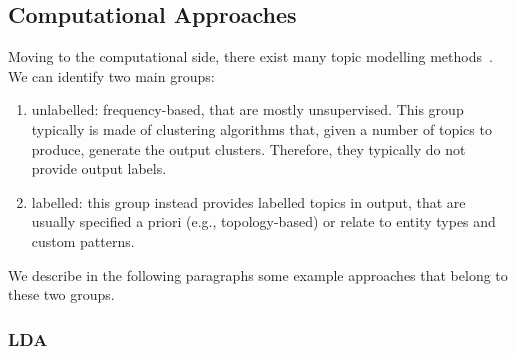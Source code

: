 



\subsection{\statusgreen Computational Approaches}
\label{sec:lit_topics_computation}

Moving to the computational side, there exist many topic modelling methods~\citep{vayansky2020review,ramage2009topic,churchill2022evolution,kherwa2019topic}.
We can identify two main groups:
\begin{enumerate}
    \item unlabelled: frequency-based, that are mostly unsupervised. This group typically is made of clustering algorithms that, given a number of topics to produce, generate the output clusters. Therefore, they typically do not provide output labels. %
    \item labelled: this group instead provides labelled topics in output, that are usually specified a priori (e.g., topology-based) or relate to entity types and custom patterns.
\end{enumerate}





We describe in the following paragraphs some example approaches that belong to these two groups.


\subsubsection{LDA}

